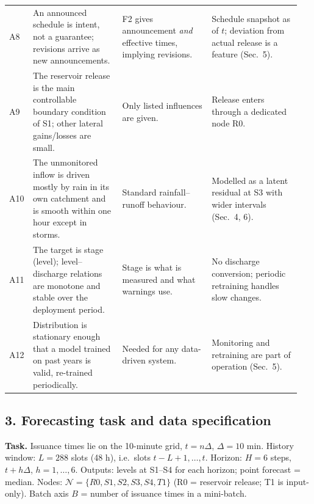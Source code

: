 \begin{longtable}{@{}p{0.05\linewidth}p{0.30\linewidth}p{0.30\linewidth}p{0.30\linewidth}@{}}
A8 & An announced schedule is intent, not a guarantee; revisions arrive as new announcements. & F2 gives announcement \emph{and} effective times, implying revisions. & Schedule snapshot as of $t$; deviation from actual release is a feature (Sec.~5).\\
A9 & The reservoir release is the main controllable boundary condition of S1; other lateral gains/losses are small. & Only listed influences are given. & Release enters through a dedicated node R0.\\
A10 & The unmonitored inflow is driven mostly by rain in its own catchment and is smooth within one hour except in storms. & Standard rainfall--runoff behaviour. & Modelled as a latent residual at S3 with wider intervals (Sec.~4, 6).\\
A11 & The target is stage (level); level--discharge relations are monotone and stable over the deployment period. & Stage is what is measured and what warnings use. & No discharge conversion; periodic retraining handles slow changes.\\
A12 & Distribution is stationary enough that a model trained on past years is valid, re-trained periodically. & Needed for any data-driven system. & Monitoring and retraining are part of operation (Sec.~5).\\
\bottomrule
\end{longtable}
\normalsize

\subsection*{3. Forecasting task and data specification}
\noindent\textbf{Task.} Issuance times lie on the 10-minute grid, $t=n\Delta$, $\Delta=10$ min. History window:
$L=288$ slots (48 h), i.e.\ slots $t-L+1,\dots,t$. Horizon: $H=6$ steps, $t+h\Delta$, $h=1,\dots,6$.
Outputs: levels at S1--S4 for each horizon; point forecast = median.
Nodes: $\mathcal N=\{R0,S1,S2,S3,S4,T1\}$ (R0 = reservoir release; T1 is input-only). Batch axis $B$ = number of
issuance times in a mini-batch.

